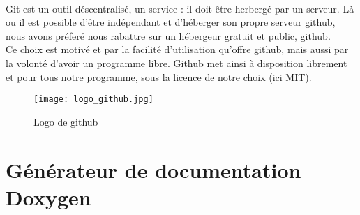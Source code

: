        \paragraph{}
            Git est un outil déscentralisé, un service : il doit être herbergé par un serveur. Là ou il est possible d'être indépendant et d'héberger son propre serveur github, nous avons préferé nous rabattre sur un hébergeur gratuit et public, github.
            \\ Ce choix est motivé et par la facilité d'utilisation qu'offre github, mais aussi par la volonté d'avoir un programme libre. Github met ainsi à 
            disposition librement et pour tous notre programme, sous la licence de notre choix (ici MIT).
            
            \begin{figure}[h]
                \begin{center}
                    \texttt{[image: logo\_github.jpg]}
                \end{center}

                \caption{Logo de github}
                \label{github}
            \end{figure}

    \newpage

    \section{Générateur de documentation Doxygen}
        
